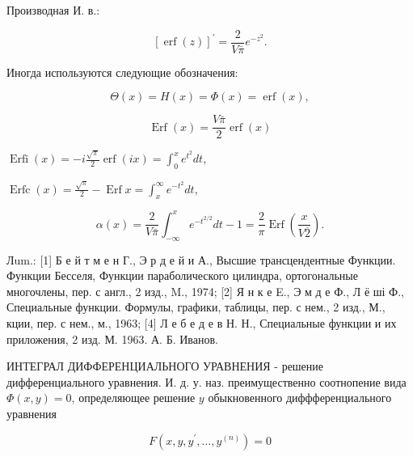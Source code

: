 \documentclass[10pt]{article}
\begin{document}
Производная И. в.:



\[

[\operatorname{erf}(z)]^{\prime}=\frac{2}{V \bar{\pi}} e^{-z^{2}} .

\]



Иногда используются следующие обозначения:



\[

\Theta(x)=H(x)=\Phi(x)=\operatorname{erf}(x),

\]



\[

\operatorname{Erf}(x)=\frac{V \bar{\pi}}{2} \operatorname{erf}(x)

\]



$\operatorname{Erfi}(x)=-i \frac{\sqrt{\pi}}{2} \operatorname{erf}(i x)=\int_{0}^{x} e^{t^{2}} d t$,



$\operatorname{Erfc}(x)=\frac{\sqrt{\pi}}{2}-\operatorname{Erf} x=\int_{x}^{\infty} e^{-t^{2}} d t$,



\[

\alpha(x)=\frac{2}{V \bar{\pi}} \int_{-\infty}^{x} e^{-t^{2 / 2}} d t-1=\frac{2}{\pi} \operatorname{Erf}\left(\frac{x}{V \overline{2}}\right) .

\]



Лum.: [1] Б е й т м е н Г., Э р д е й и А., Высшие трансцендентные Функции. Функции Бесселя, Функции параболического цилиндра, ортогональные многочлены, пер. с англ., 2 изд., M., 1974; [2] Я н к е E., Э м д е Ф., Л ё ші Ф., Специальные функции. Формулы, графики, таблицы, пер. с нем., 2 изд., М., кции, пер. с нем., м., 1963; [4] Л е б е д е в Н. Н., Специальные функции и их приложения, 2 изд. М. 1963. А. Б. Иванов.



ИНТЕГРАЛ ДИФФЕРЕНЦИАЛЬНОГО УРАВНЕНИЯ - решение дифференциального уравнения. И. д. у. наз. преимущественно соотнопение вида $\Phi(x, y)=0$, определяющее решение $y$ обыкновенного диффференциального уравнения



\[

F\left(x, y, y^{\prime}, \ldots, y^{(n)}\right)=0

\]
\end{document}
